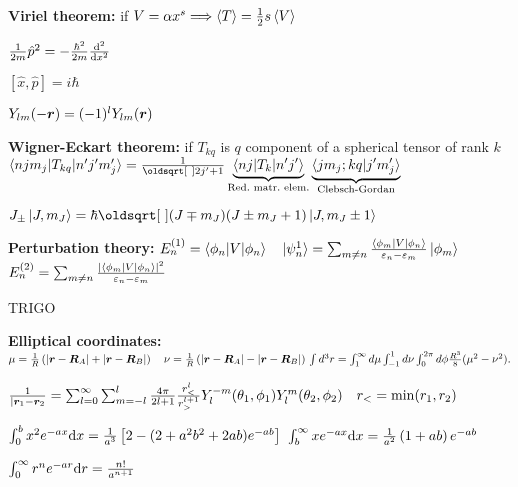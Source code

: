 \begin{squishlist}
    \item \textbf{Viriel theorem:} if $V = \alpha x^s \Longrightarrow \braket{T} = \frac{1}{2}s \braket{V}$
    \item $\frac{1}{2m}\hat{p}^2 = - \frac{\hbar^2}{2m} \dder{x}{}$
    \item $[\hat{x}, \hat{p}] = i \hbar$
    \item $Y_{lm}(-\vr) = (-1)^l Y_{lm}(\vr)$
    \item \textbf{Wigner-Eckart theorem:} if $T_{kq}$ is $q$ component of a spherical tensor of rank $k$ \\
    $\braket{n j m_j | T_{kq} | n' j' m_j'} = \frac{1}{\sqrt{2j'+1}} \underbrace{\braket{n j | T_k | n'j'}}_{\text{Red.\ matr.\ elem.}} \underbrace{\braket{j m_j ; k q | j' m_j'}}_{\text{Clebsch-Gordan}}$

    \item $J_{\pm} \ket{J,m_J} = \hbar \sqrt{(J \mp m_J)(J \pm m_J + 1)} \ket{J,m_J \pm 1 }$
    \item \textbf{Perturbation theory:} $E_n^{(1)}=\braket{\phi_n|V|\phi_n} \quad \ket{\psi^1_n} = \sum_{m\neq n}\frac{\braket{\phi_m|V|\phi_n}}{\varepsilon_n - \varepsilon_m} \ket{\phi_m}$ \\
    $E_n^{(2)} = \sum_{m\neq n}\frac{|\braket{\phi_m|V|\phi_n}|^2}{\varepsilon_n - \varepsilon_m}$
    \item TRIGO
    \item \textbf{Elliptical coordinates:} $\mu = \frac{1}{R} \left(|\vec{r}-\vec{R}_A| + | \vec{r} - \vec{R}_B| \right) \quad 
    \nu = \frac{1}{R} \left(|\vec{r}-\vec{R}_A| - | \vec{r} - \vec{R}_B| \right) \\
    \int d^3r = \int_1^\infty d\mu \int_{-1}^1 d \nu \int_0^{2\pi} d \phi \frac{R^3}{8} ( \mu^2 - \nu^2).$
    \item $\frac{1}{|\vr_1 - \vr_2} = \sum_{l=0}^{\infty} \sum_{m=-l}^{l} \frac{4\pi}{2l+1} \frac{r_<^l}{r_>^{l+1}} Y_l^{-m}(\theta_1, \phi_1) Y_l^{m}(\theta_2, \phi_2) \quad r_< = \min(r_1,r_2)$
\end{squishlist}

\begin{squishlist}
    \item $\int_{0}^{b} x^2 e^{-ax} \ud x = \frac{1}{a^3}\left[2 - (2 + a^2 b^2 + 2ab)e^{-ab}\right]$ 
    \squishsep $\int_{b}^{\infty} x e^{-ax} \ud x = \frac{1}{a^2} \left(1 + ab\right)e^{-ab}$
    \item $\int_{0}^{\infty} r^n e^{-ar} \ud r = \frac{n!}{a^{n+1}}$
\end{squishlist}